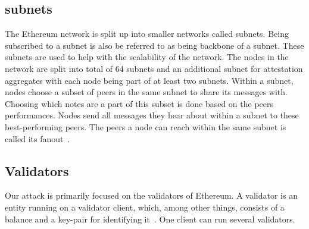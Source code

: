 \subsection{subnets}\label{subsec:subnets}
The Ethereum network is split up into smaller networks called subnets.
Being subscribed to a subnet is also be referred to as being backbone of a subnet.
These subnets are used to help with the scalability of the network.
The nodes in the network are split into total of 64 subnets and an additional subnet for attestation aggregates with each node being part of at least two subnets.
Within a subnet, nodes choose a subset of peers in the same subnet to share its messages with.
Choosing which notes are a part of this subset is done based on the peers performances.
Nodes send all messages they hear about within a subnet to these best-performing peers.
The peers a node can reach within the same subnet is called its fanout~\cite{heimbach2024deanonymizingethereumvalidatorsp2p}.



%
%

\subsection{Validators}\label{subsec:validator}
Our attack is primarily focused on the validators of Ethereum.
A validator is an entity running on a validator client,
which, among other things, consists of a balance and a key-pair for identifying it~\cite{Staking}.
One client can run several validators.

